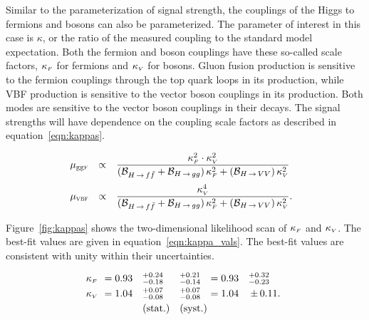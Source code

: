Similar to the parameterization of signal strength, the couplings of the Higgs to fermions and bosons can also be parameterized. The parameter of interest in this case is $\kappa$, or the ratio of the measured coupling to the standard model expectation. Both the fermion and boson couplings have these so-called scale factors, $\kappa_{\mbox{\tiny $F$}}$ for fermions and $\kappa_{\mbox{\tiny $V$}}$ for bosons. Gluon fusion production is sensitive to the fermion couplings through the top quark loops in its production, while VBF production is sensitive to the vector boson couplings in its production. Both modes are sensitive to the vector boson couplings in their decays. The signal strengths will have dependence on the coupling scale factors as described in equation~\ref{eqn:kappas}\cite{LHCXSWG}. 

\begin{equation}
\np%
\begin{array}{lc l}
  \mu_{\scggF} &\propto &{\displaystyle\frac{\kF^2 \cdot \kV^2}{(\BF_{\Hff}+\BF_{\Hgg})\,\kF^2+(\BF_{\HVV})\,\kV^2}}\\ \clineskip\clineskip
  \mu_{\scVBF} &\propto &{\displaystyle\frac{\kV^4            }{(\BF_{\Hff}+\BF_{\Hgg})\,\kF^2+(\BF_{\HVV})\,\kV^2}} . 
\end{array}
\label{eqn:kappas}
\end{equation}

Figure~\ref{fig:kappas} shows the two-dimensional likelihood scan of $\kappa_{\mbox{\tiny $F$}}$ and $\kappa_{\mbox{\tiny $V$}}$. The best-fit values are given in equation~\ref{eqn:kappa_vals}. The best-fit values are consistent with unity within their uncertainties. 

\begin{equation}
\begin{array}{llllll}
\no\kF\no&=0.93\no&\,\,^{+0.24}_{-0.18}\np&^{+0.21}_{-0.14}\np&=0.93&^{+0.32}_{-0.23} \\ \clineskip
\no\kV\no&=1.04\no&\,\,^{+0.07}_{-0.08}\np&^{+0.07}_{-0.08}\np&=1.04&{\PM}0.11.\\ \clineskip
                     &        & ~\textrm{(stat.)}     &\textrm{(syst.)}\np
\end{array}
\label{eqn:kappa_vals}
\end{equation}


